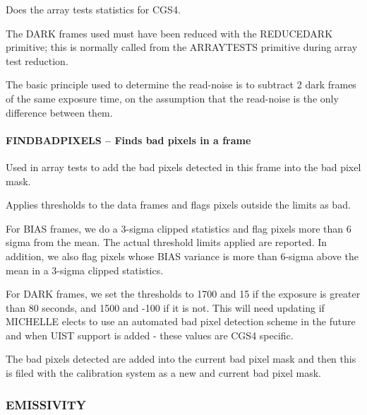 \documentclass[twoside,11pt]{article}
\renewcommand{\_}{\texttt{\symbol{95}}}
\begin{document}
\mbox{}

Does the array tests statistics for CGS4.



The DARK frames used must have been reduced with the \_REDUCE\_DARK\_
primitive; this is normally called from the \_ARRAY\_TESTS\_ primitive
during array test reduction.



The basic principle used to determine the read-noise is to subtract 2
dark frames of the same exposure time, on the assumption that the
read-noise is the only difference between them.



\paragraph*{\_FIND\_BAD\_PIXELS\_ -- Finds bad pixels in a frame\label{_FIND_BAD_PIXELS_--_Finds_bad_pixels_in_a_frame}}



\mbox{}

Used in array tests to add the bad pixels detected in this frame into the 
bad pixel mask.



Applies thresholds to the data frames and flags pixels outside
the limits as bad.



For BIAS frames, we do a 3-sigma clipped statistics and flag pixels more
than 6 sigma from the mean. The actual threshold limits applied are
reported. In addition, we also flag pixels whose BIAS variance is more
than 6-sigma above the mean in a 3-sigma clipped statistics.



For DARK frames, we set the thresholds to 1700 and 15 if the exposure
is greater than 80 seconds, and 1500 and -100 if it is not. This will
need updating if MICHELLE elects to use an automated bad pixel
detection scheme in the future and when UIST support is added - these
values are CGS4 specific.



The bad pixels detected are added into the current bad pixel mask and
then this is filed with the calibration system as a new and current
bad pixel mask.


\subsubsection{EMISSIVITY}
\end{document}
